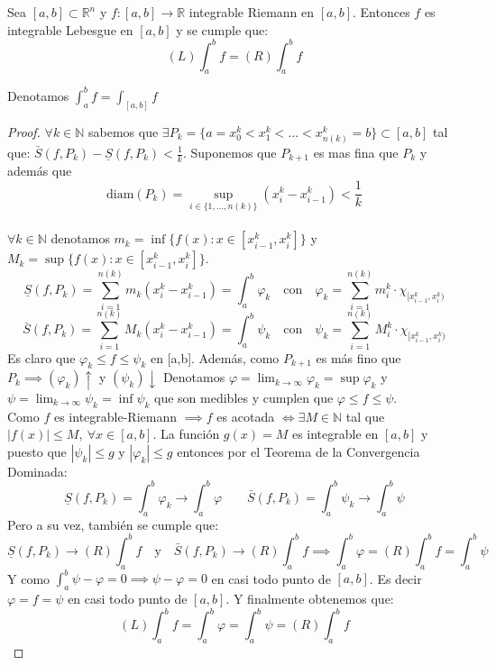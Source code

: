 \begin{teorema}
    Sea $[a, b] \subset \mathbb{R}^n$ y $ f:[a,b] \to \mathbb{R}$ integrable Riemann en $[a, b]$. Entonces $f$ es integrable Lebesgue en $[a, b]$ y se cumple que:
    $$ (L) \int_{a}^{b}f = (R) \int_{a}^{b}f $$
\end{teorema}
\begin{observación}
Denotamos $\int_{a}^{b}f = \int_{[a, b]}f$
\end{observación}
\begin{proof}
    $\forall k \in \mathbb{N}$ sabemos que $\exists P_k = \{ a = x_0^k < x_1^k < \dots < x_{n(k)}^k = b \} \subset [a,b]$ tal que: $\bar{S}(f, P_k) - \underline{S}(f, P_k) < \frac{1}{k}$.
    Suponemos que $P_{k+1}$ es mas fina que $P_{k}$ y además que $$\text{diam}(P_k) = \sup_{i \in \{1, \dots, n(k)\}}(x_i^k - x_{i-1}^k) < \frac{1}{k}$$
    \\$\forall k \in \mathbb{N}$ denotamos $m_k = \inf\{f(x) : x \in [x_{i-1}^k, x_i^k]\}$ y $M_k = \sup\{f(x) : x \in [x_{i-1}^k, x_i^k]\}$.
    $$ \underline{S}(f, P_k) = \sum_{i=1}^{n(k)}m_k(x_i^k - x_{i-1}^k) = \int_{a}^{b}\varphi_k \quad \text{con} \quad \varphi_k = \sum_{i = 1}^{n(k)}m_i^k\cdot\chi_{[x_{i-1}^k, x_i^k)}$$
    $$\bar{S}(f, P_k) = \sum_{i=1}^{n(k)}M_k(x_i^k - x_{i-1}^k) = \int_{a}^{b} \psi_k \quad \text{con}  \quad \psi_k  = \sum_{i = 1}^{n(k)}M_i^k\cdot\chi_{[x_{i-1}^k, x_i^k)}$$
    Es claro que $\varphi_k  \leq f \leq \psi_k$ en [a,b].
    Además, como $P_{k+1}$ es más fino que $P_k \implies (\varphi_{k})\uparrow$ y $(\psi_k)\downarrow$
    Denotamos $\varphi = \lim_{k \to \infty}\varphi_k = \sup\varphi_k$
    y $\psi  = \lim_{k \to \infty}\psi_k = \inf\psi_k$ que son medibles y cumplen que $\varphi \leq f \leq \psi$.\\
    Como $f$ es integrable-Riemann $\implies f$ es acotada $\iff \exists M \in \mathbb{N}$ tal que $|f(x)| \leq M, \ \forall x \in [a, b]$.
    La función  $ g(x) = M $ es integrable en $[a, b]$ y puesto que $|\psi_k| \leq g$ y $|\varphi_k| \leq g$ entonces por el Teorema de la Convergencia Dominada: $$\underline{S}(f, P_{k}) = \int_{a}^{b}{\varphi_k} \to \int_{a}^{b}\varphi \qquad \bar{S}(f, P_{k}) = \int_a^b\psi_k \to \int_a^b\psi$$
    Pero a su vez, también se cumple que: \\ $$\underline{S}(f, P_k) \to (R)\int_a^b f \quad \text{y} \quad \bar{S}(f, P_k) \to (R)\int_{a}^{b} f \implies \int_{a}^{b} \varphi = (R)\int_{a}^{b} f = \int_{a}^{b} \psi$$
    Y como $\int_{a}^{b} \psi - \varphi = 0 \implies \psi - \varphi = 0$ en casi todo punto de $[a, b]$. Es decir $\varphi = f = \psi$ en casi todo punto de $[a, b]$. Y finalmente obtenemos que:
    $$(L)\int_{a}^{b}f = \int_{a}^{b}\varphi = \int_a^b\psi = (R)\int_{a}^{b}f$$
\end{proof}

